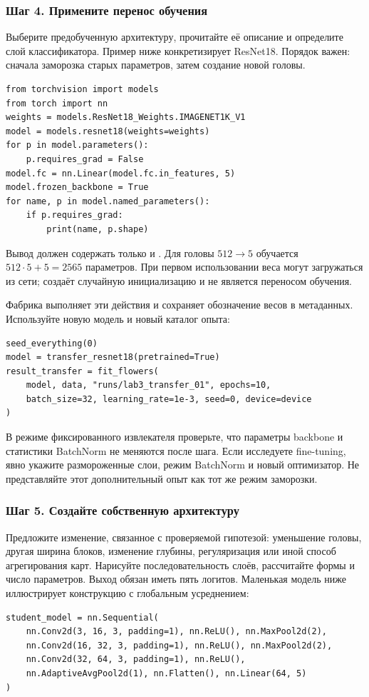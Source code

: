 \subsubsection*{Шаг 4. Примените перенос обучения}
Выберите предобученную архитектуру, прочитайте её описание и определите слой классификатора. Пример ниже конкретизирует ResNet18. Порядок важен: сначала заморозка старых параметров, затем создание новой головы.
\begin{lstlisting}
from torchvision import models
from torch import nn
weights = models.ResNet18_Weights.IMAGENET1K_V1
model = models.resnet18(weights=weights)
for p in model.parameters():
    p.requires_grad = False
model.fc = nn.Linear(model.fc.in_features, 5)
model.frozen_backbone = True
for name, p in model.named_parameters():
    if p.requires_grad:
        print(name, p.shape)
\end{lstlisting}
Вывод должен содержать только  и . Для головы \(512\to5\) обучается \(512\cdot5+5=2565\) параметров. При первом использовании веса могут загружаться из сети;  создаёт случайную инициализацию и не является переносом обучения.

Фабрика  выполняет эти действия и сохраняет обозначение весов в метаданных. Используйте новую модель и новый каталог опыта:
\begin{lstlisting}
seed_everything(0)
model = transfer_resnet18(pretrained=True)
result_transfer = fit_flowers(
    model, data, "runs/lab3_transfer_01", epochs=10,
    batch_size=32, learning_rate=1e-3, seed=0, device=device
)
\end{lstlisting}
В режиме фиксированного извлекателя проверьте, что параметры backbone и статистики BatchNorm не меняются после шага. Если исследуете fine-tuning, явно укажите размороженные слои, режим BatchNorm и новый оптимизатор. Не представляйте этот дополнительный опыт как тот же режим заморозки.

\subsubsection*{Шаг 5. Создайте собственную архитектуру}
Предложите изменение, связанное с проверяемой гипотезой: уменьшение головы, другая ширина блоков, изменение глубины, регуляризация или иной способ агрегирования карт. Нарисуйте последовательность слоёв, рассчитайте формы и число параметров. Выход обязан иметь пять логитов. Маленькая модель ниже иллюстрирует конструкцию с глобальным усреднением:
\begin{lstlisting}
student_model = nn.Sequential(
    nn.Conv2d(3, 16, 3, padding=1), nn.ReLU(), nn.MaxPool2d(2),
    nn.Conv2d(16, 32, 3, padding=1), nn.ReLU(), nn.MaxPool2d(2),
    nn.Conv2d(32, 64, 3, padding=1), nn.ReLU(),
    nn.AdaptiveAvgPool2d(1), nn.Flatten(), nn.Linear(64, 5)
)
\end{lstlisting}

